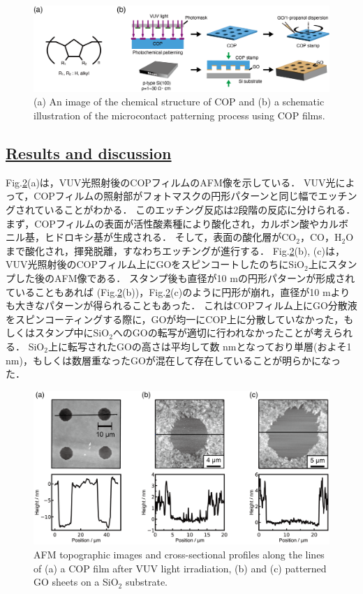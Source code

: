 \documentclass[platex,dvipdfmx]{jlreq}			%
\begin{document}
\begin{figure}[H]
    \centering
    \includegraphics[width=120mm]{figures/figure5.png}
    \caption{(a) An image of the chemical structure of COP and (b) a schematic illustration of the microcontact patterning process using COP films.}
    \label{fig:COP}
\end{figure}

\subsection*{\ul{Results and discussion}}

Fig.\ref{fig:COP_AFM}(a)は，VUV光照射後のCOPフィルムのAFM像を示している．
VUV光によって，COPフィルムの照射部がフォトマスクの円形パターンと同じ幅でエッチングされていることがわかる．
このエッチング反応は2段階の反応に分けられる．
まず，COPフィルムの表面が活性酸素種により酸化され，カルボン酸やカルボニル基，ヒドロキシ基が生成される．
そして，表面の酸化層がCO$_2$，CO，H$_2$Oまで酸化され，揮発脱離，すなわちエッチングが進行する．
Fig.\ref{fig:COP_AFM}(b), (c)は，VUV光照射後のCOPフィルム上にGOをスピンコートしたのちにSiO$_2$上にスタンプした後のAFM像である．
スタンプ後も直径が10 \textmu mの円形パターンが形成されていることもあれば (Fig.\ref{fig:COP_AFM}(b))，Fig.\ref{fig:COP_AFM}(c)のように円形が崩れ，直径が10 \textmu mよりも大きなパターンが得られることもあった．
これはCOPフィルム上にGO分散液をスピンコーティングする際に，GOが均一にCOP上に分散していなかった，もしくはスタンプ中にSiO$_2$へのGOの転写が適切に行われなかったことが考えられる．
SiO$_2$上に転写されたGOの高さは平均して数 nmとなっており単層(およそ1 nm)，もしくは数層重なったGOが混在して存在していることが明らかになった．

\begin{figure}[H]
    \centering
    \includegraphics[width=150mm]{figures/figure6.png}
    \caption{AFM topographic images and cross-sectional profiles along the lines of (a) a COP film after VUV light irradiation, (b) and (c) patterned GO sheets on a SiO$_2$ substrate.}
    \label{fig:COP_AFM}
\end{figure}
\end{document}
